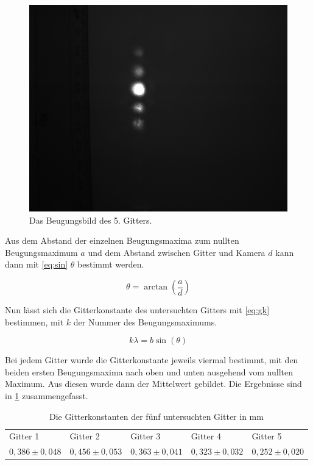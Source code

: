 \begin{figure}
	\centering
	\includegraphics[scale=0.4]{Gitter5.jpg}
	\caption{Das Beugungsbild des 5. Gitters.}
	\label{Gitter5}
\end{figure}

Aus dem Abstand der einzelnen Beugungsmaxima zum nullten Beugungsmaximum $a$ und dem Abstand zwischen Gitter und Kamera $d$ kann dann mit \cref{eq:sin} $\theta$ bestimmt werden.

\begin{equation}
	\theta = \arctan\left(\frac{a}{d}\right)
	\label{eq:sin}
\end{equation}

Nun lässt sich die Gitterkonstante des untersuchten Gitters mit \cref{eq:gk} bestimmen, mit $k$ der Nummer des Beugungsmaximums.

\begin{equation}
	k\lambda = b \sin(\theta)
	\label{eq:gk}
\end{equation}

Bei jedem Gitter wurde die Gitterkonstante jeweils viermal bestimmt, mit den beiden ersten Beugungsmaxima nach oben und unten ausgehend vom nullten Maximum. Aus diesen wurde dann der Mittelwert gebildet. Die Ergebnisse sind in \cref{tab} zusammengefasst.

\begin{table}[h]
	\caption{Die Gitterkonstanten der fünf untersuchten Gitter in mm}
\begin{tabular}{lllll}
	Gitter 1 & Gitter 2& Gitter 3& Gitter 4& Gitter 5\\
	 $0,386\pm0,048$ & $0,456\pm0,053$ & $0,363\pm0,041$ & $0,323\pm0,032$ & $0,252\pm0,020$
\end{tabular}
\label{tab}
\end{table}

